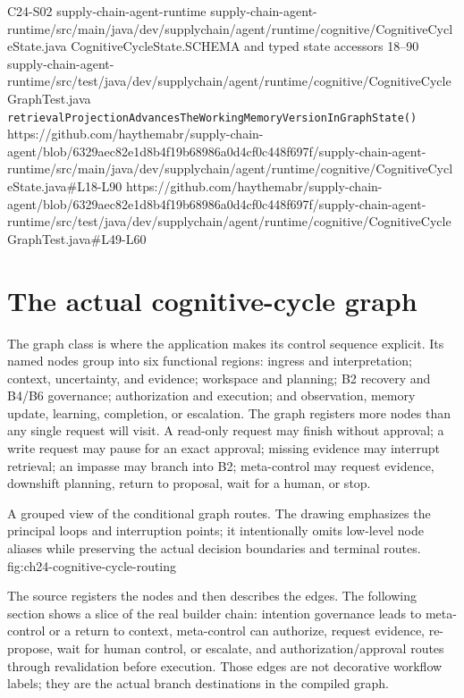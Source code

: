 \BookSourceReferenceNoQR
  {C24-S02}
  {supply-chain-agent-runtime}
  {supply-chain-agent-runtime/src/main/java/dev/supplychain/agent/runtime/cognitive/CognitiveCycleState.java}
  {CognitiveCycleState.SCHEMA and typed state accessors}
  {18--90}
  {supply-chain-agent-runtime/src/test/java/dev/supplychain/agent/runtime/cognitive/CognitiveCycleGraphTest.java}
  {\texttt{retrievalProjectionAdvancesTheWorkingMemoryVersionInGraphState()}}
  {https://github.com/haythemabr/supply-chain-agent/blob/6329aec82e1d8b4f19b68986a0d4cf0c448f697f/supply-chain-agent-runtime/src/main/java/dev/supplychain/agent/runtime/cognitive/CognitiveCycleState.java\#L18-L90}
  {https://github.com/haythemabr/supply-chain-agent/blob/6329aec82e1d8b4f19b68986a0d4cf0c448f697f/supply-chain-agent-runtime/src/test/java/dev/supplychain/agent/runtime/cognitive/CognitiveCycleGraphTest.java\#L49-L60}

\section{The actual cognitive-cycle graph}
\label{sec:ch24-actual-graph}

The graph class is where the application makes its control sequence explicit. Its named nodes group into six functional regions: ingress and interpretation; context, uncertainty, and evidence; workspace and planning; B2 recovery and B4/B6 governance; authorization and execution; and observation, memory update, learning, completion, or escalation. The graph registers more nodes than any single request will visit. A read-only request may finish without approval; a write request may pause for an exact approval; missing evidence may interrupt retrieval; an impasse may branch into B2; meta-control may request evidence, downshift planning, return to proposal, wait for a human, or stop.

  {A grouped view of the conditional graph routes. The drawing emphasizes the principal loops and interruption points; it intentionally omits low-level node aliases while preserving the actual decision boundaries and terminal routes.}
  {fig:ch24-cognitive-cycle-routing}

The source registers the nodes and then describes the edges. The following section shows a slice of the real builder chain: intention governance leads to meta-control or a return to context, meta-control can authorize, request evidence, re-propose, wait for human control, or escalate, and authorization/approval routes through revalidation before execution. Those edges are not decorative workflow labels; they are the actual branch destinations in the compiled graph.

